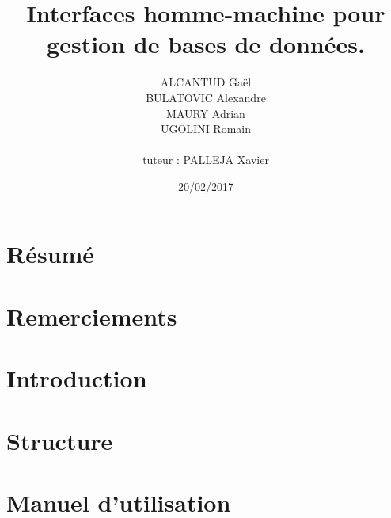 \documentclass[12pt, a4paper, twoside, openright]{book}
\title{Interfaces homme-machine pour gestion de bases de données.}
\author{ALCANTUD Gaël \\ BULATOVIC Alexandre \\ MAURY Adrian \\ UGOLINI Romain \\ \\tuteur : PALLEJA Xavier}
\date{20/02/2017}
\begin{document}
\frontmatter
\maketitle

\thispagestyle{empty}
\chapter*{Résumé}


\thispagestyle{empty}
\chapter*{Remerciements}


\tableofcontents
\listoffigures
\printglossaries

\mainmatter
\chapter{Introduction}



\chapter{Structure}


\chapter{Manuel d'utilisation}


\backmatter
\end{document}
